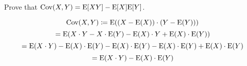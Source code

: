 \question Prove that $\text{Cov}(X, Y) = \text{E}[XY] - \text{E}[X]\text{E}[Y]$. 
\begin{solution}[.75 cm]
	\[\text{Cov}(X, Y) \coloneqq \text{E} ((X - \text{E}(X)) \cdot (Y - \text{E}(Y)))\]
	\[ = \text{E} (X \cdot Y - X \cdot \text{E}(Y) - \text{E}(X) \cdot Y + \text{E}(X) \cdot \text{E}(Y)) \]
	\[ = \text{E} (X \cdot Y) - \text{E}(X) \cdot \text{E}(Y) - \text{E}(X) \cdot \text{E}(Y) - \text{E}(X) \cdot \text{E}(Y) + \text{E}(X) \cdot \text{E}(Y) \]
	\[ = \text{E} (X \cdot Y) - \text{E}(X) \cdot \text{E}(Y) \]
\end{solution}